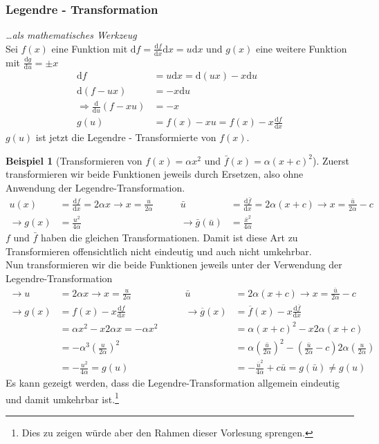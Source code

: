\documentclass[oneside]{book}
\theoremstyle{definition}
\newtheorem*{beispiel*}{Beispiel}
\renewcommand{\d}{\mathrm d}
\newcommand{\md}{\d}
\begin{document}
\subsubsection{Legendre - Transformation} \textit{\dots als mathematisches Werkzeug}\\
Sei $f(x)$ eine Funktion mit $\md f = \frac{\md f}{\md x} \md x = u \md x$ und $g(x)$ eine weitere Funktion mit $\frac{\md g}{\md u} = \pm x$
\begin{align*}
\md f &= u\md x = \md (ux) - x\md u\\
\md (f-ux) &= - x \md u\\
\Rightarrow \frac{\md}{\md u}(f-xu) &= -x\\
g(u) &= f(x) - xu = f(x) - x\frac{\md f}{\md x}
\end{align*}
$g(u)$ ist jetzt die Legendre - Transformierte von $f(x)$.
	
	
	
\begin{beispiel*}[Transformieren von $f(x) = \alpha x^2$ und $\bar{f}(x) = \alpha(x+c)^2$]
	Zuerst transformieren wir beide Funktionen jeweils durch Ersetzen, also ohne Anwendung der Legendre-Transformation.
\begin{align*}
u(x) &= \frac{\md f}{\md x} = 2 \alpha x \rightarrow x= \frac{u}{2\alpha} & \qquad   \bar u &= \frac{\md \bar f}{\md x} = 2\alpha(x+c) \rightarrow x=\frac{\bar u}{2\alpha} - c\\
\rightarrow g(x) &= \frac{u^2}{4\alpha} & \qquad  \rightarrow \bar g(\bar u) &= \frac{\bar x^2}{4\alpha}
\end{align*}
$f$ und $\bar f$ haben die gleichen Transformationen. Damit ist diese Art zu Transformieren offensichtlich nicht eindeutig und auch nicht umkehrbar.\\
Nun transformieren wir die beide Funktionen jeweils unter der Verwendung der Legendre-Transformation
\begin{align*}
\rightarrow u &= 2\alpha x \rightarrow x= \frac {u}{2\alpha}      &  \qquad \bar{u} &= 2\alpha (x+c) \rightarrow x= \frac {\bar{u}}{2\alpha} -c\\
\rightarrow g(x) &= f(x) - x\frac{\md f}{\md x}  &  \qquad   \rightarrow \overline g(x) &= \overline f(x) - x\frac{\md \overline f}{\md x}\\
&= \alpha x^2 - x2\alpha x = -\alpha x^2         &    \qquad    &= \alpha (x+c)^2 - x 2\alpha( x+c)\\
&=-\alpha^3(\frac{u}{2\alpha})^2      &  \qquad    &= \alpha (\frac {\bar{u}}{2\alpha})^2 - (\frac {\bar u}{2\alpha} -c) 2\alpha( \frac {u}{2\alpha} )\\
&= -\frac{u^2}{4\alpha} = g(u)   &  \qquad    &= -\frac {\bar{u}^2}{4\alpha} +c\bar{u} = g(\bar{u}) \neq g(u)
\end{align*}
Es kann gezeigt werden, dass die Legendre-Transformation allgemein eindeutig und damit umkehrbar ist.\footnote{Dies zu zeigen würde aber den Rahmen dieser Vorlesung sprengen.}
\end{beispiel*}
\end{document}
